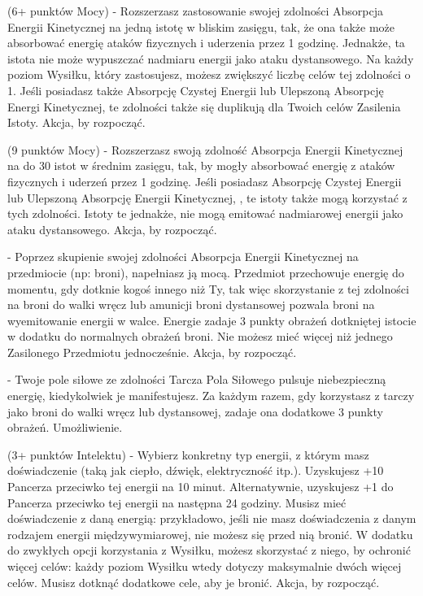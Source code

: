 { (6+ punktów Mocy) - Rozszerzasz zastosowanie swojej zdolności Absorpcja Energii Kinetycznej na jedną istotę w bliskim zasięgu, tak, że ona także może absorbować energię ataków fizycznych i uderzenia przez 1 godzinę. Jednakże, ta istota nie może wypuszczać nadmiaru energii jako ataku dystansowego. Na każdy poziom Wysiłku, który zastosujesz, możesz zwiększyć liczbę celów tej zdolności o 1. Jeśli posiadasz także Absorpcję Czystej Energii lub Ulepszoną Absorpcję Energi Kinetycznej, te zdolności także się duplikują dla Twoich celów Zasilenia Istoty. Akcja, by rozpocząć. 

 (9 punktów Mocy) - Rozszerzasz swoją zdolność Absorpcja Energii Kinetycznej na do 30 istot w średnim zasięgu, tak, by mogły absorbować energię z ataków fizycznych i uderzeń przez 1 godzinę. Jeśli posiadasz Absorpcję Czystej Energii lub Ulepszoną Absorpcję Energii Kinetycznej, , te istoty także mogą korzystać z tych zdolności. Istoty te jednakże, nie mogą emitować nadmiarowej energii jako ataku dystansowego. Akcja, by rozpocząć.
 
  - Poprzez skupienie swojej zdolności Absorpcja Energii Kinetycznej na przedmiocie (np: broni), napełniasz ją mocą. Przedmiot przechowuje energię do momentu, gdy dotknie kogoś innego niż Ty, tak więc skorzystanie z tej zdolności na broni do walki wręcz lub amunicji broni dystansowej pozwala broni na wyemitowanie energii w walce. Energie zadaje 3 punkty obrażeń dotkniętej istocie w dodatku do normalnych obrażeń broni. Nie możesz mieć więcej niż jednego Zasilonego Przedmiotu jednocześnie. Akcja, by rozpocząć. 
 
 - Twoje pole siłowe ze zdolności Tarcza Pola Siłowego pulsuje niebezpieczną energię, kiedykolwiek je manifestujesz. Za każdym razem, gdy korzystasz z tarczy jako broni do walki wręcz lub dystansowej, zadaje ona dodatkowe 3 punkty obrażeń. Umożliwienie.

 (3+ punktów Intelektu) - Wybierz konkretny typ energii, z którym masz doświadczenie (taką jak ciepło, dźwięk, elektryczność itp.). Uzyskujesz +10 Pancerza przeciwko tej energii na 10 minut. Alternatywnie, uzyskujesz +1 do Pancerza przeciwko tej energii na następna 24 godziny. Musisz mieć doświadczenie z daną energią: przykładowo, jeśli nie masz doświadczenia z danym rodzajem energii międzywymiarowej, nie możesz się przed nią bronić. W dodatku do zwykłych opcji korzystania z Wysiłku, możesz skorzystać z niego, by ochronić więcej celów: każdy poziom Wysiłku wtedy dotyczy maksymalnie dwóch więcej celów. Musisz dotknąć dodatkowe cele, aby je bronić. Akcja, by rozpocząć.

}
